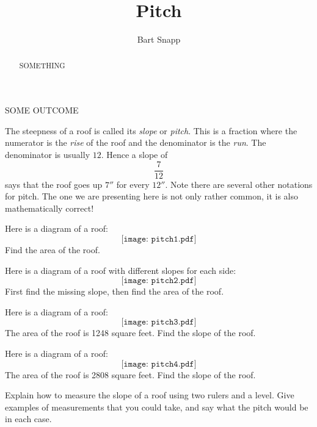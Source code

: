 \documentclass{ximera}
\title{Pitch}
\author{Bart Snapp}
\begin{document}
\begin{abstract}
  SOMETHING
\end{abstract}
\maketitle

\begin{listOutcomes}
\item{SOME OUTCOME}
\end{listOutcomes}



The steepness of a roof is called its \textit{slope} or
\textit{pitch}. This is a fraction where the numerator is the
\textit{rise} of the roof and the denominator is the \textit{run}. The
denominator is usually $12$. Hence a slope of
\[
\frac{7}{12}
\]
says that the roof goes up $7''$ for every $12''$. Note there are
several other notations for pitch. The one we are presenting here is
not only rather common, it is also mathematically correct!

\begin{question}
Here is a diagram of a roof:
\[
\texttt{[image: pitch1.pdf]}
\]
Find the area of the roof. 
\end{question}

\begin{question}
Here is a diagram of a roof with different slopes for each side: 
\[
\texttt{[image: pitch2.pdf]}
\]
First find the missing slope, then find the area of the roof.
\end{question}

\begin{question}
Here is a diagram of a roof: 
\[
\texttt{[image: pitch3.pdf]}
\]
The area of the roof is 1248 square feet. Find the slope of the
roof.
\end{question}

\begin{question}
Here is a diagram of a roof: 
\[
\texttt{[image: pitch4.pdf]}
\]
The area of the roof is 2808 square feet. Find the slope of the
roof.
\end{question}


\begin{question}
Explain how to measure the slope of a roof using two rulers and a
level. Give examples of measurements that you could take, and say what
the pitch would be in each case.
\end{question}

\break
\end{document}
